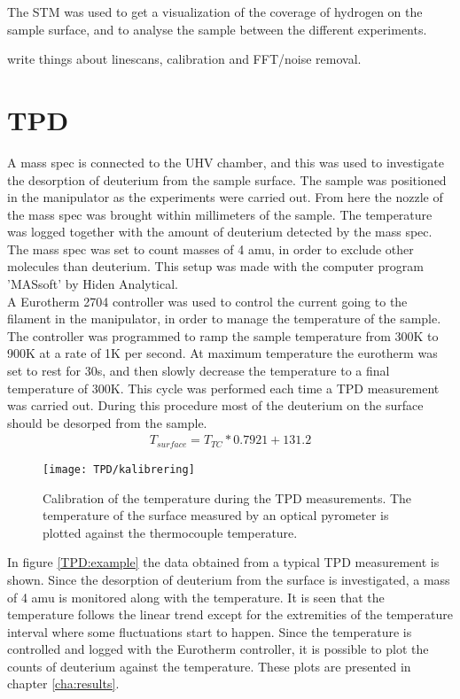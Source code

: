 The STM was used to get a visualization of the coverage of hydrogen on the sample surface, and to analyse the sample between the different experiments.


write things about linescans, calibration and FFT/noise removal.

\section{TPD}

A mass spec is connected to the UHV chamber, and this was used to investigate the desorption of deuterium from the sample surface. The sample was positioned in the manipulator as the experiments were carried out. From here the nozzle of the mass spec was brought within millimeters of the sample. The temperature was logged together with the amount of deuterium detected by the mass spec. The mass spec was set to count masses of 4 amu, in order to exclude other molecules than deuterium. This setup was made with the computer program 'MASsoft' by Hiden Analytical.\\
A Eurotherm 2704 controller was used to control the current going to the filament in the manipulator, in order to manage the temperature of the sample. The controller was programmed to ramp the sample temperature from 300K to 900K at a rate of 1K per second. At maximum temperature the eurotherm was set to rest for 30s, and then slowly decrease the temperature to a final temperature of 300K. This cycle was performed each time a TPD measurement was carried out. During this procedure most of the deuterium on the surface should be desorped from the sample.\\
\begin{align*}
  T_{surface} = T_{TC} * 0.7921 + 131.2
\end{align*}
\begin{figure}
  \centering
  \texttt{[image: TPD/kalibrering]}
  \caption{Calibration of the temperature during the TPD measurements. The temperature of the surface measured by an optical pyrometer is plotted against the thermocouple temperature.}
  \label{TPDcalibration}
\end{figure}
In figure \ref{TPD:example} the data obtained from a typical TPD measurement is shown. Since the desorption of deuterium from the surface is investigated, a mass of 4 amu is monitored along with the temperature. It is seen that the temperature follows the linear trend except for the extremities of the temperature interval where some fluctuations start to happen. Since the temperature is controlled and logged with the Eurotherm controller, it is possible to plot the counts of deuterium against the temperature. These plots are presented in chapter \ref{cha:results}.\\
